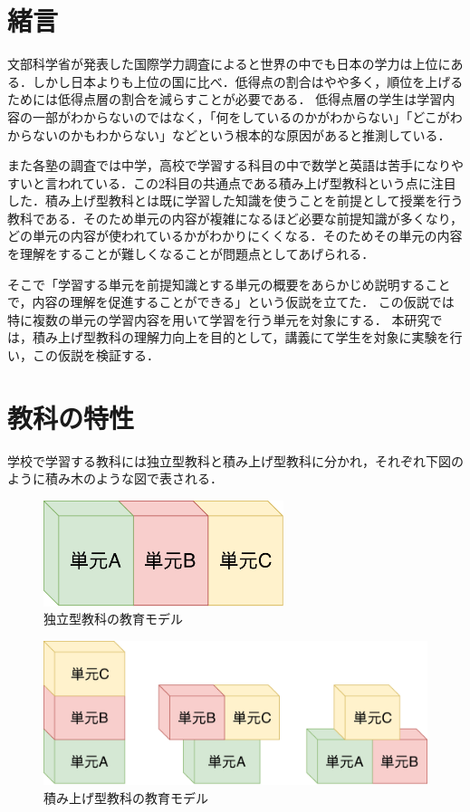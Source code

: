 \documentclass[a4j,12pt]{jsarticle}
\begin{document}

\semi

\tableofcontents

\newpage
\section{緒言}
文部科学省が発表した国際学力調査によると世界の中でも日本の学力は上位にある．しかし日本よりも上位の国に比べ．低得点の割合はやや多く，順位を上げるためには低得点層の割合を減らすことが必要である．
低得点層の学生は学習内容の一部がわからないのではなく，「何をしているのかがわからない」「どこがわからないのかもわからない」などという根本的な原因があると推測している．

また各塾の調査では中学，高校で学習する科目の中で数学と英語は苦手になりやすいと言われている\cite{1}．この2科目の共通点である積み上げ型教科という点に注目した．積み上げ型教科とは既に学習した知識を使うことを前提として授業を行う教科である．そのため単元の内容が複雑になるほど必要な前提知識が多くなり，どの単元の内容が使われているかがわかりにくくなる．そのためその単元の内容を理解をすることが難しくなることが問題点としてあげられる．

そこで「学習する単元を前提知識とする単元の概要をあらかじめ説明することで，内容の理解を促進することができる」という仮説を立てた．
この仮説では特に複数の単元の学習内容を用いて学習を行う単元を対象にする．
本研究では，積み上げ型教科の理解力向上を目的として，講義にて学生を対象に実験を行い，この仮説を検証する．

\newpage
\section{教科の特性}
学校で学習する教科には独立型教科と積み上げ型教科に分かれ，それぞれ下図のように積み木のような図で表される．\\

\begin{figure}[H]
\centering
\includegraphics[width=7cm]{02.pdf}
\caption{独立型教科の教育モデル}
\label{fig:02}
\end{figure} 

\begin{figure}[H]
\centering
\includegraphics[width=12cm]{03.pdf}
\caption{積み上げ型教科の教育モデル}
\label{fig:03}
\end{figure} 
\end{document}
